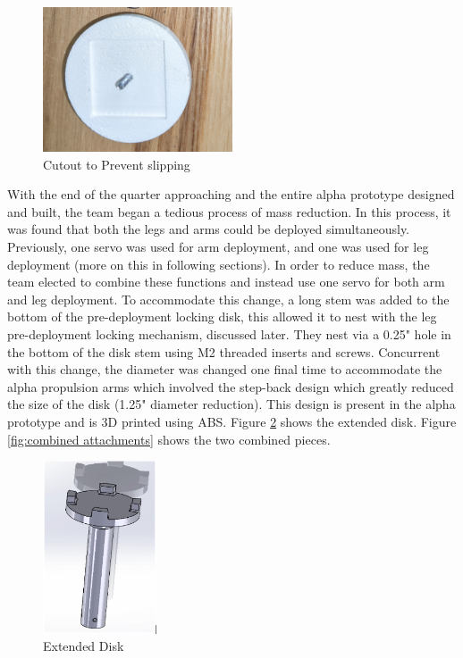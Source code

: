 \begin{figure}[H]
    \centering
    \includegraphics[width=0.5\textwidth]{src/figs/Spool_Cutout.jpg}
    \caption{Cutout to Prevent slipping}
    \label{fig:cutout}
\end{figure}

With the end of the quarter approaching and the entire alpha prototype designed and built, the team began a tedious process of mass reduction. In this process, it was found that both the legs and arms could be deployed simultaneously. Previously, one servo was used for arm deployment, and one was used for leg deployment (more on this in following sections). In order to reduce mass, the team elected to combine these functions and instead use one servo for both arm and leg deployment. To accommodate this change, a long stem was added to the bottom of the pre-deployment locking disk, this allowed it to nest with the leg pre-deployment locking mechanism, discussed later. They nest via a 0.25" hole in the bottom of the disk stem using M2 threaded inserts and screws. Concurrent with this change, the diameter was changed one final time to accommodate the alpha propulsion arms which involved the step-back design which greatly reduced the size of the disk (1.25" diameter reduction). This design is present in the alpha prototype and is 3D printed using ABS. Figure \ref{fig:extendeddisk} shows the extended disk. Figure \ref{fig:combined attachments} shows the two combined pieces. 

\begin{figure}[H]
    \centering
    \includegraphics[width=0.3\textwidth]{src/figs/extendeddisk.png}
    \caption{Extended Disk}
    \label{fig:extendeddisk}
\end{figure}

